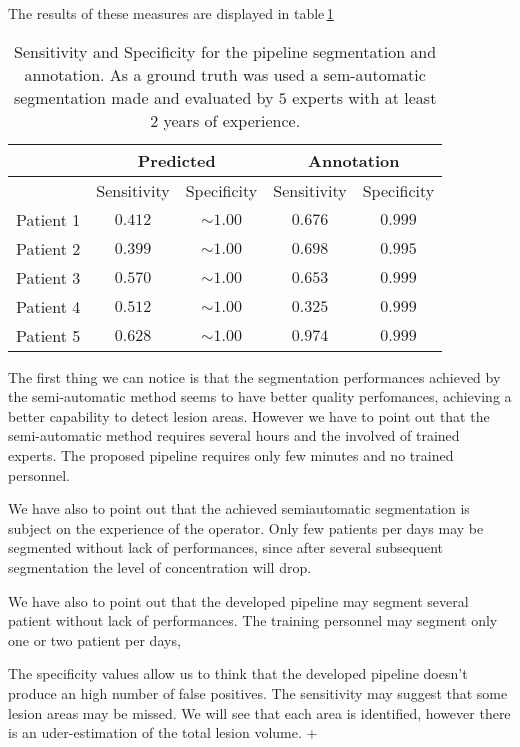\documentclass{standalone}
\begin{document}
	The results of these measures are displayed in table\,\ref{tab:Measures}
	\begin{table}[h!]
		\centering
		\begin{tabular}{|c|c|c|c|c|}
			\hline
			\multirow{2}{*}{}		  & \multicolumn{2}{c|}{Predicted} & \multicolumn{2}{c|}{Annotation} \\ \hline
						& Sensitivity & Specificity	 		& Sensitivity & Specificity		 \\ \hline
			Patient 1	& $0.412$	  &	$\sim 1.00$			&	$0.676$	  &	$ 0.999$ 		 \\ 
			Patient 2	& $0.399$	  & $\sim 1.00$ 		&	$0.698$	  & $ 0.995$		 \\
			Patient 3	& $0.570$	  &	$\sim 1.00$			&	$0.653$	  & $ 0.999$		 \\
			Patient 4	& $0.512$	  & $\sim 1.00$			&	$0.325$	  & $ 0.999$		 \\
			Patient 5 	& $0.628$	  & $\sim 1.00$			&	$0.974$	  &	$ 0.999$		 \\ \hline
		\end{tabular}\caption{Sensitivity and Specificity for the pipeline segmentation and annotation. As a ground truth was used a sem-automatic segmentation made and evaluated by $5$ experts with at least $2$ years of experience.}\label{tab:Measures}
		
	\end{table}
	
	
	The first thing we can notice is that the segmentation performances achieved by the semi-automatic method seems to have better quality perfomances, achieving a better capability to detect lesion areas. However we have to point out that the semi-automatic method requires several hours and the involved of trained experts. The proposed pipeline requires only few minutes and no trained personnel.
	
	We have also to point out that the achieved semiautomatic segmentation is subject on the experience of the operator. Only few patients per days may be segmented without lack of performances, since after several subsequent segmentation the level of concentration will drop.
	
	
	 
	We have also to point out that the developed pipeline may segment several patient without lack of performances. The training personnel may segment only one or two patient per days, 
	
	The specificity values allow us to think that the developed pipeline doesn't produce an high number of false positives. The  sensitivity may suggest that some lesion areas may be missed. We will see that each area is identified, however there is an uder-estimation of the total lesion volume. +
		
\end{document}
